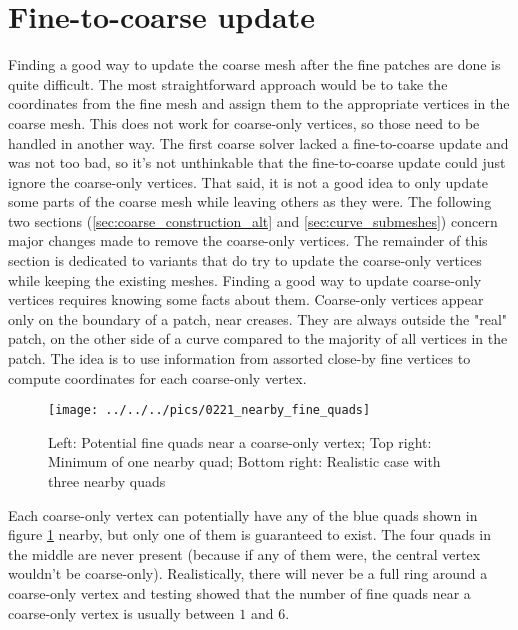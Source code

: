 \documentclass[a4paper,twoside,12pt,nochapterprefix]{scrbook}
\begin{document}
\section{Fine-to-coarse update}\label{ftc_update}
Finding a good way to update the coarse mesh after the fine patches are done is quite difficult. The most straightforward approach would be to take the coordinates from the fine mesh and assign them to the appropriate vertices in the coarse mesh. This does not work for coarse-only vertices, so those need to be handled in another way.\newline
The first coarse solver lacked a fine-to-coarse update and was not too bad, so it's not unthinkable that the fine-to-coarse update could just ignore the coarse-only vertices. That said, it is not a good idea to only update some parts of the coarse mesh while leaving others as they were.\newline
The following two sections (\ref{sec:coarse_construction_alt} and \ref{sec:curve_submeshes}) concern major changes made to remove the coarse-only vertices. The remainder of this section is dedicated to variants that do try to update the coarse-only vertices while keeping the existing meshes.\newline
Finding a good way to update coarse-only vertices requires knowing some facts about them. Coarse-only vertices appear only on the boundary of a patch, near creases. They are always outside the "real" patch, on the other side of a curve compared to the majority of all vertices in the patch. The idea is to use information from assorted close-by fine vertices to compute coordinates for each coarse-only vertex.\newline
\begin{figure}
    \centering
    \texttt{[image: ../../../pics/0221\_nearby\_fine\_quads]}
    \caption{Left: Potential fine quads near a coarse-only vertex; Top right: Minimum of one nearby quad; Bottom right: Realistic case with three nearby quads
      \label{fig:coarseonly_neighbourhood}}
\end{figure}
Each coarse-only vertex can potentially have any of the blue quads shown in figure \ref{fig:coarseonly_neighbourhood} nearby, but only one of them is guaranteed to exist. The four quads in the middle are never present (because if any of them were, the central vertex wouldn't be coarse-only). Realistically, there will never be a full ring around a coarse-only vertex and testing showed that the number of fine quads near a coarse-only vertex is usually between $1$ and $6$.\newline
\end{document}
